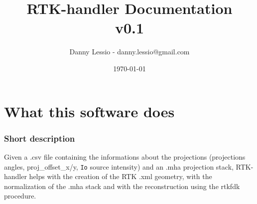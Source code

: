 \documentclass[a4paper,11pt, oneside]{article}
\title{ RTK-handler Documentation\\v0.1 }
\author{Danny Lessio - danny.lessio@gmail.com}
\date{\today}
\begin{document}
  \maketitle
  \tableofcontents

  \newpage
  \part{ What this software does }
    \section{ Short description }
    Given a .csv file containing the informations about the projections (projections angles, proj\_offset\_x/y, \texttt{Io} source intensity) and an .mha projection stack, RTK-handler helps with the creation of the RTK .xml geometry, with the normalization of the .mha stack and with the reconstruction using the rtkfdk procedure.
    
\end{document}
